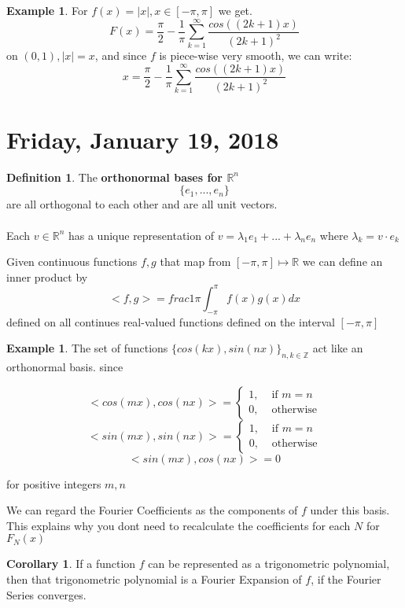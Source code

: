 \documentclass[12pt]{article}
\theoremstyle{plain}
\theoremstyle{definition}
\newtheorem{definition}[theorem]{Definition}
\newtheorem{example}[theorem]{Example}
\newtheorem{corollary}[theorem]{Corollary}
\begin{document}
\begin{example}
	For $f(x)=|x|, x\in [-\pi,\pi]$ we get.
	$$F(x) = \frac{\pi}{2} - \frac{1}{\pi}\sum^\infty_{k=1} \frac{cos((2k+1)x)}{(2k+1)^2}$$
	on $(0,1), |x|=x$, and since $f$ is piece-wise very smooth, we can write:
	$$x=\frac{\pi}{2} - \frac{1}{\pi}\sum^\infty_{k=1} \frac{cos((2k+1)x)}{(2k+1)^2}$$
\end{example}

\section{Friday, January 19, 2018}

\begin{definition}
	The \textbf{orthonormal bases for $\mathbb{R}^n$}
	$$\{ e_1, ..., e_n \}$$
	are all orthogonal to each other and are all unit vectors.\\
	\\
	Each $v\in \mathbb{R}^n$ has a unique representation of
	$v = \lambda_1 e_1 + ... + \lambda_n e_n$ where $\lambda_k = v \cdot e_k$
\end{definition}

Given continuous functions $f,g$ that map from $[-\pi, \pi] \mapsto \mathbb{R}$ we can define an inner product by
$$<f,g> = frac{1}{\pi} \int^{\pi}_{-\pi} f(x) g(x) dx$$ defined on all continues real-valued functions defined on the interval $[-\pi, \pi] $

\begin{example}
	The set of functions $\{ cos(kx), sin(nx) \}_{n,k\in\mathbb{Z}}$ act like an orthonormal basis. since
	
	$$<cos(mx), cos(nx)> = \begin{cases}1, &\text{ if } m=n\\ 0, &\text{ otherwise} \end{cases}$$
	$$<sin(mx), sin(nx)> = \begin{cases}1, &\text{ if } m=n\\ 0, &\text{ otherwise} \end{cases}$$
	$$<sin(mx), cos(nx)> = 0$$
	
	for positive integers $m,n$
\end{example}

We can regard the Fourier Coefficients as the components of $f$ under this basis. This explains why you dont need to recalculate the coefficients for each $N$ for $F_N (x)$

\begin{corollary}
	If a function $f$ can be represented as a trigonometric polynomial, then that trigonometric polynomial is a Fourier Expansion of $f$, if the Fourier Series converges.
\end{corollary}
\end{document}
